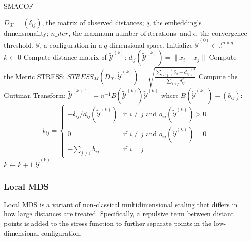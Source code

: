 \begin{algorithm}
    \caption{SMACOF}
    \label{alg:SMACOF}
    
    \begin{algorithmic}[1]
    \REQUIRE $D_{\mathcal{X}} = (\delta_{ij})$, the matrix of observed distances; $q$, the embedding's dimensionality; $n\_iter$, the maximum number of iterations; and $\epsilon$, the convergence threshold.
    \ENSURE $\tilde{\mathcal{Y}}$, a configuration in a $q$-dimensional space.
    \STATE Initialize $\tilde{\mathcal{Y}}^{(0)} \in \mathbb{R}^{n \times q}$
    \STATE $k \leftarrow 0$
    \REPEAT
        \STATE Compute distance matrix of $\tilde{\mathcal{Y}}^{(k)}$:  $d_{ij}(\tilde{\mathcal{Y}}^{(k)}) = \|x_i - x_j\|$
        \STATE Compute the Metric STRESS: $STRESS_M(D_{\mathcal{X}}, \tilde{\mathcal{Y}}^{(k)}) = \sqrt{\frac{\sum_{i<j}\left(\delta_{i j}-d_{i j}\right)^2}{\sum_{i<j} \delta_{i j}^2}}$
        \STATE Compute the Guttman Transform: $\tilde{\mathcal{Y}}^{(k+1)} = n^{-1}B(\tilde{\mathcal{Y}}^{(k)})\tilde{\mathcal{Y}}^{(k)}$ where $B(\tilde{\mathcal{Y}}^{(k)}) = (b_{ij})$:
        $$
        b_{ij} =
        \begin{cases}
        -\delta_{ij}/d_{ij}(\tilde{\mathcal{Y}}^{(k)}) & \text{if } i \neq j \text{ and } d_{ij}(\tilde{\mathcal{Y}}^{(k)}) > 0 \\
        0 & \text{if } i \neq j \text{ and } d_{ij}(\tilde{\mathcal{Y}}^{(k)}) = 0 \\
        -\sum_{j \neq i} b_{ij} & \text{if } i = j
        \end{cases}
        $$
        \STATE $k \leftarrow k + 1$
    \RETURN $\tilde{\mathcal{Y}}^{(k)}$
    \end{algorithmic}
\end{algorithm}

\subsubsection{Local MDS}

Local MDS \cite{LocalMDS} is a variant of non-classical multidimensional scaling that differs in how large distances are treated. Specifically, a repulsive term between distant points is added to the stress function to further separate points in the low-dimensional configuration.

